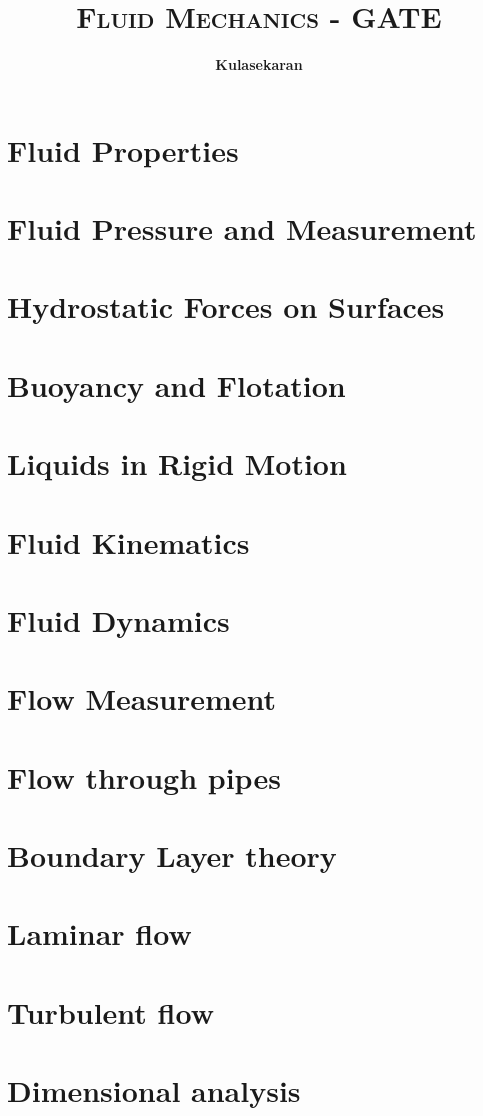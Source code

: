 \documentclass[8pt]{report}
\title{\Huge{\textsc{Fluid Mechanics - GATE}}}
\author{\huge{\textbf{Kulasekaran}}}
\begin{document}
\maketitle
\tableofcontents
\chapter{Fluid Properties}
\chapter{Fluid Pressure and Measurement}
\chapter{Hydrostatic Forces on Surfaces}
\chapter{Buoyancy and Flotation}
\chapter{Liquids in Rigid Motion}
\chapter{Fluid Kinematics}
\chapter{Fluid Dynamics}
\chapter{Flow Measurement}
\chapter{Flow through pipes}
\chapter{Boundary Layer theory}
\chapter{Laminar flow}
\chapter{Turbulent flow}
\chapter{Dimensional analysis}
\end{document}
